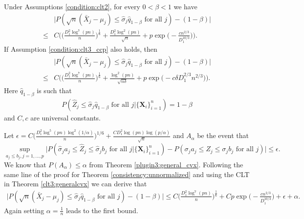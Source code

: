 \documentclass[mnsc,blindrev]{informs4} %
\begin{document}
\begin{theorem}\label{consistency:normalized_generalcvx}
Under Assumptions \ref{condition:clt2}, for every $0<\beta<1$ we have
\begin{align*}
&\lvert P(\sqrt n(\bar{X}_j-\mu_j)\leq \hat\sigma_j\hat q_{1-\beta}\text{ for all }j)-(1-\beta)\rvert\\
\leq  &C\Big(\Big(\frac{D_1^2\log^7(pn)}{n}\Big)^{\frac{1}{6}}+\frac{D_1^2\log^2(pn)}{\sqrt n}+p\exp\big(-\frac{cn^{2/3}}{D_1^{10/3}}\big)\Big).
\end{align*}
If Assumption \ref{condition:clt3_ccp} also holds, then
\begin{align*}
&\lvert P(\sqrt n(\bar{X}_j-\mu_j)\leq \hat\sigma_j\hat q_{1-\beta}\text{ for all }j)-(1-\beta)\rvert\\
\leq& C\Big(\Big(\frac{D_1^2\log^7(pn)}{n}\Big)^{\frac{1}{6}}+\frac{\log^2 (pn)}{\sqrt{n\delta}}+p\exp\big(-c\delta D_1^{2/3}n^{2/3}\big)\Big).
\end{align*}
Here $\hat q_{1-\beta}$ is such that
\begin{align*}
P(\widehat Z_j\leq \hat\sigma_j\hat q_{1-\beta}\text{ for all }j\vert \{\mathbf X_i\}_{i=1}^n)=1-\beta
\end{align*}
and $C,c$ are universal constants.
\end{theorem}
Let $\epsilon=C\Big(\frac{D_1^2\log^5(pn)\log^2(1/\alpha)}{n}\Big)^{1/6}+\frac{CD_1^2\log(pn)\log(p/\alpha)}{\sqrt n}$ and $A_{\alpha}$ be the event that
\begin{equation*}
\sup_{a_j\leq b_j,j=1,\ldots,p}\Big\lvert P(\hat\sigma_ja_j\leq \widehat{Z}_j\leq \hat\sigma_jb_j\text{ for all }j\vert \{\mathbf X_i\}_{i=1}^n)-P(\sigma_ja_j\leq Z_j\leq \sigma_jb_j\text{ for all }j)\Big\rvert\leq \epsilon.
\end{equation*}
We know that $P(A_{\alpha})\leq \alpha$ from Theorem \ref{plugin3:general_cvx}. Following the same line of the proof for Theorem \ref{consistency:unnormalized} and using the CLT in Theorem \ref{clt3:generalcvx} we can derive that
\begin{align*}
\lvert P(\sqrt n(\bar{X}_j-\mu_j)\leq \hat\sigma_j\hat q_{1-\beta}\text{ for all }j)-(1-\beta)\rvert\leq C\Big(\frac{D_1^2\log^7(pn)}{n}\Big)^{\frac{1}{6}}+Cp\exp\big(-\frac{cn^{2/3}}{D_1^{10/3}}\big)+\epsilon+\alpha.
\end{align*}
Again setting $\alpha=\frac{1}{n}$ leads to the first bound.
\end{document}

